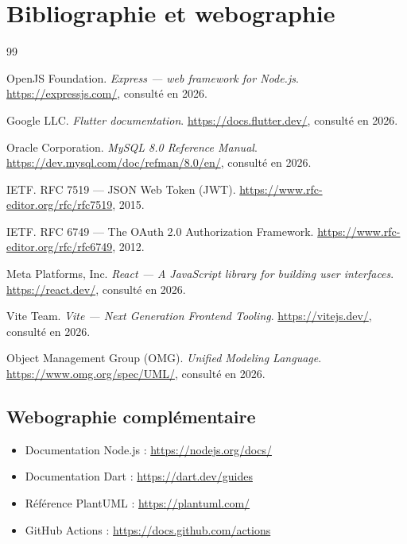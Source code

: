 \chapter{Bibliographie et webographie}

\begin{thebibliography}{99}

OpenJS Foundation.
\newblock \textit{Express — web framework for Node.js}.
\newblock \url{https://expressjs.com/}, consulté en 2026.

Google LLC.
\newblock \textit{Flutter documentation}.
\newblock \url{https://docs.flutter.dev/}, consulté en 2026.

Oracle Corporation.
\newblock \textit{MySQL 8.0 Reference Manual}.
\newblock \url{https://dev.mysql.com/doc/refman/8.0/en/}, consulté en 2026.

IETF.
\newblock RFC 7519 — JSON Web Token (JWT).
\newblock \url{https://www.rfc-editor.org/rfc/rfc7519}, 2015.

IETF.
\newblock RFC 6749 — The OAuth 2.0 Authorization Framework.
\newblock \url{https://www.rfc-editor.org/rfc/rfc6749}, 2012.

Meta Platforms, Inc.
\newblock \textit{React — A JavaScript library for building user interfaces}.
\newblock \url{https://react.dev/}, consulté en 2026.

Vite Team.
\newblock \textit{Vite — Next Generation Frontend Tooling}.
\newblock \url{https://vitejs.dev/}, consulté en 2026.

Object Management Group (OMG).
\newblock \textit{Unified Modeling Language}.
\newblock \url{https://www.omg.org/spec/UML/}, consulté en 2026.

\end{thebibliography}

\section*{Webographie complémentaire}

\begin{itemize}[leftmargin=*]
  \item Documentation Node.js : \url{https://nodejs.org/docs/}
  \item Documentation Dart : \url{https://dart.dev/guides}
  \item Référence PlantUML : \url{https://plantuml.com/}
  \item GitHub Actions : \url{https://docs.github.com/actions}
\end{itemize}
